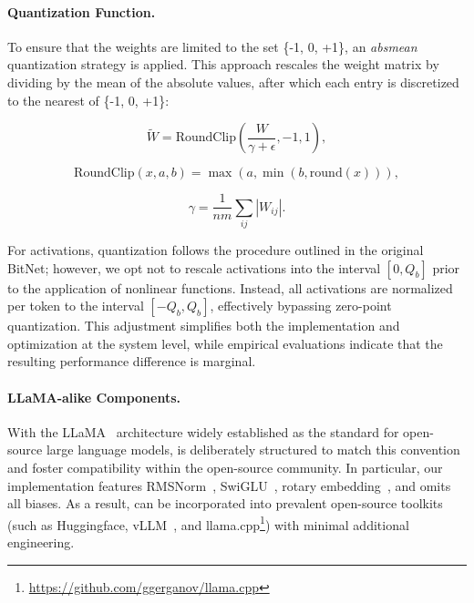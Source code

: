 \paragraph{Quantization Function.} To ensure that the weights are limited to the set \{-1, 0, +1\}, an \emph{absmean} quantization strategy is applied. This approach rescales the weight matrix by dividing by the mean of the absolute values, after which each entry is discretized to the nearest of \{-1, 0, +1\}:

\begin{equation}
    \widetilde{W} = \mathrm{RoundClip}(\frac{W}{\gamma + \epsilon}, -1, 1),
\end{equation}

\begin{equation}
    \mathrm{RoundClip}(x, a, b) = \max(a, \min(b, \mathrm{round}(x))),
\end{equation}

\begin{equation}
    \gamma = \frac{1}{nm}\sum_{ij} |W_{ij}|.
\end{equation}

For activations, quantization follows the procedure outlined in the original BitNet; however, we opt not to rescale activations into the interval $[0, Q_b]$ prior to the application of nonlinear functions. Instead, all activations are normalized per token to the interval $[-Q_b, Q_b]$, effectively bypassing zero-point quantization. This adjustment simplifies both the implementation and optimization at the system level, while empirical evaluations indicate that the resulting performance difference is marginal.

\paragraph{LLaMA-alike Components.}

With the LLaMA~\cite{llama, llama2} architecture widely established as the standard for open-source large language models,  is deliberately structured to match this convention and foster compatibility within the open-source community. In particular, our implementation features RMSNorm~\cite{rmsnorm}, SwiGLU~\cite{swiglu}, rotary embedding~\cite{rope}, and omits all biases. As a result,  can be incorporated into prevalent open-source toolkits (such as Huggingface, vLLM~\cite{vllm}, and llama.cpp\footnote{\url{https://github.com/ggerganov/llama.cpp}}) with minimal additional engineering.

